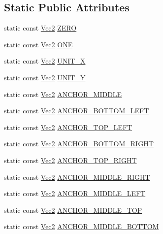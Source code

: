 \subsection*{Static Public Attributes}
\begin{DoxyCompactItemize}
\item 
static const \hyperlink{classVec2}{Vec2} \hyperlink{classVec2_a5c80e2e7c8bd2adcbad2844d060e6245}{Z\+E\+RO}
\item 
static const \hyperlink{classVec2}{Vec2} \hyperlink{classVec2_a6b62ec70b5f9d4b6f78341a73b38d328}{O\+NE}
\item 
static const \hyperlink{classVec2}{Vec2} \hyperlink{classVec2_a27246f9cb36cc90f9b8d5abbcab43abb}{U\+N\+I\+T\+\_\+X}
\item 
static const \hyperlink{classVec2}{Vec2} \hyperlink{classVec2_a7b47ef0848a379cc5085ea0b3f2a1182}{U\+N\+I\+T\+\_\+Y}
\item 
static const \hyperlink{classVec2}{Vec2} \hyperlink{classVec2_acd17600fac6fc51d4a847831ed7ffa92}{A\+N\+C\+H\+O\+R\+\_\+\+M\+I\+D\+D\+LE}
\item 
static const \hyperlink{classVec2}{Vec2} \hyperlink{classVec2_ad33063675bb83f6fa1337d3d049fec3e}{A\+N\+C\+H\+O\+R\+\_\+\+B\+O\+T\+T\+O\+M\+\_\+\+L\+E\+FT}
\item 
static const \hyperlink{classVec2}{Vec2} \hyperlink{classVec2_ab0533215e446e0381d01bf49edd7ab7c}{A\+N\+C\+H\+O\+R\+\_\+\+T\+O\+P\+\_\+\+L\+E\+FT}
\item 
static const \hyperlink{classVec2}{Vec2} \hyperlink{classVec2_a89dea3751d0e72f6aa959e9b727bd8f6}{A\+N\+C\+H\+O\+R\+\_\+\+B\+O\+T\+T\+O\+M\+\_\+\+R\+I\+G\+HT}
\item 
static const \hyperlink{classVec2}{Vec2} \hyperlink{classVec2_a54a9b9e7162320f202595e489f2e8d02}{A\+N\+C\+H\+O\+R\+\_\+\+T\+O\+P\+\_\+\+R\+I\+G\+HT}
\item 
static const \hyperlink{classVec2}{Vec2} \hyperlink{classVec2_af8e20f7ed236cff72c1fd159a3f033f3}{A\+N\+C\+H\+O\+R\+\_\+\+M\+I\+D\+D\+L\+E\+\_\+\+R\+I\+G\+HT}
\item 
static const \hyperlink{classVec2}{Vec2} \hyperlink{classVec2_a4544bfcd8e350d7fccda1a25d8f7399b}{A\+N\+C\+H\+O\+R\+\_\+\+M\+I\+D\+D\+L\+E\+\_\+\+L\+E\+FT}
\item 
static const \hyperlink{classVec2}{Vec2} \hyperlink{classVec2_a5c840d335260ef9cf62a14b342c567ec}{A\+N\+C\+H\+O\+R\+\_\+\+M\+I\+D\+D\+L\+E\+\_\+\+T\+OP}
\item 
static const \hyperlink{classVec2}{Vec2} \hyperlink{classVec2_a5388b50c2923ea6aa54f4b0ab31f80ed}{A\+N\+C\+H\+O\+R\+\_\+\+M\+I\+D\+D\+L\+E\+\_\+\+B\+O\+T\+T\+OM}
\end{DoxyCompactItemize}


